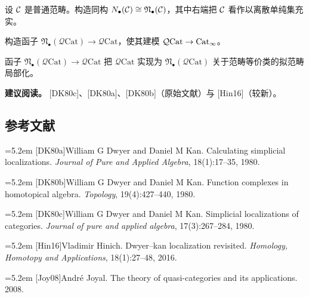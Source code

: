 \begin{exercise}\label{L5-A.1}
设 $\mathcal{C}$ 是普通范畴。构造同构 $N_{\bullet}(\mathcal{C})\cong\mathfrak{N}_{\bullet}(\mathcal{C})$，其中右端把 $\mathcal{C}$ 看作以离散单纯集充实。
\end{exercise}

\begin{exercise}\label{L5-A.2}
构造函子 $\mathfrak{N}_{\bullet}(\mathcal{Q}\mathrm{Cat})\to\mathcal{Q}\mathrm{Cat}$，使其建模 $\mathcal{Q}\mathrm{Cat}\to\operatorname{Cat}_\infty$。
\end{exercise}

\begin{theorem}\label{L5-A.3}
函子 $\mathfrak{N}_{\bullet}(\mathcal{Q}\mathrm{Cat})\to\mathcal{Q}\mathrm{Cat}$ 把 $\mathcal{Q}\mathrm{Cat}$ 实现为 $\mathfrak{N}_{\bullet}(\mathcal{Q}\mathrm{Cat})$ 关于范畴等价类的拟范畴局部化。
\end{theorem}

\nitem\label{L5-A.4} \textbf{建议阅读。} [DK80c]、[DK80a]、[DK80b]（原始文献）与 [Hin16]（较新）。

\subsection*{参考文献}
\par\noindent\hangindent=5.2em [DK80a]\hspace{0.6em}William G Dwyer and Daniel M Kan. Calculating simplicial localizations. \emph{Journal of Pure and Applied Algebra}, 18(1):17--35, 1980.
\par\noindent\hangindent=5.2em [DK80b]\hspace{0.6em}William G Dwyer and Daniel M Kan. Function complexes in homotopical algebra. \emph{Topology}, 19(4):427--440, 1980.
\par\noindent\hangindent=5.2em [DK80c]\hspace{0.6em}William G Dwyer and Daniel M Kan. Simplicial localizations of categories. \emph{Journal of pure and applied algebra}, 17(3):267--284, 1980.
\par\noindent\hangindent=5.2em [Hin16]\hspace{0.6em}Vladimir Hinich. Dwyer--kan localization revisited. \emph{Homology, Homotopy and Applications}, 18(1):27--48, 2016.
\par\noindent\hangindent=5.2em [Joy08]\hspace{0.6em}Andr\'e Joyal. The theory of quasi-categories and its applications. 2008.
